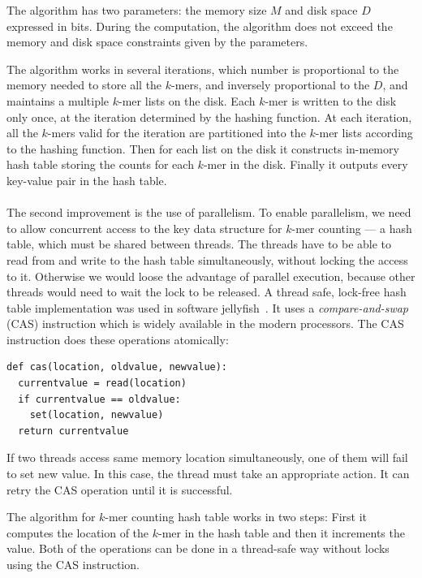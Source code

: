 The algorithm has two parameters: the memory size $M$ and disk space $D$ expressed in bits. During the computation, the algorithm does not exceed the memory and disk space constraints given by the parameters.

The algorithm works in several iterations, which number is proportional to the memory needed to store all the $k$-mers, and inversely proportional to the $D$, and maintains a multiple $k$-mer lists on the disk.
Each $k$-mer is written to the disk only once, at the iteration determined by the hashing function.
At each iteration, all the $k$-mers valid for the iteration are partitioned into the $k$-mer lists according to the hashing function.
Then for each list on the disk it constructs in-memory hash table storing the counts for each $k$-mer in the disk.
Finally it outputs every key-value pair in the hash table.

\paragraph{} The second improvement is the use of parallelism. To enable parallelism, we need to allow concurrent access to the key data structure for $k$-mer counting --- a hash table, which must be shared between threads. The threads have to be able to read from and write to the hash table simultaneously, without locking the access to it. Otherwise we would loose the advantage of parallel execution, because other threads would need to wait the lock to be released. A thread safe, lock-free hash table implementation was used in software jellyfish~\cite{jellyfish}. It uses a \emph{compare-and-swap} (CAS) instruction which is widely available in the modern processors. The CAS instruction does these operations atomically:
\begin{lstlisting}
def cas(location, oldvalue, newvalue):
  currentvalue = read(location)
  if currentvalue == oldvalue:
    set(location, newvalue)
  return currentvalue
\end{lstlisting}
If two threads access same memory location simultaneously, one of them will fail to set new value. In this case, the thread must take an appropriate action.
It can retry the CAS operation until it is successful.

The algorithm for $k$-mer counting hash table works in two steps:
First it computes the location of the $k$-mer in the hash table and then it increments the value. Both of the operations can be done in a thread-safe way without locks using the CAS instruction.

